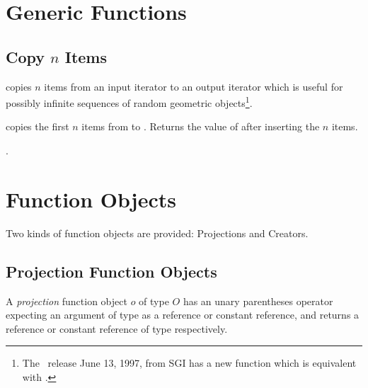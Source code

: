 \section{Generic Functions}
\label{sectionGenericFunctions}

\subsection{Copy $n$ Items}
\label{sectionCopyN}

 copies $n$ items from an input iterator to an
output iterator which is useful for possibly infinite sequences of 
random geometric objects\footnote{%
  The \stl\ release June 13, 1997, from SGI has a new function
   which is equivalent with .}.


{copies the first $n$ items from  to .
    Returns the value of  after inserting the $n$ items.}

\ccSeeAlso

.



\newpage
\section{Function Objects}

Two kinds of function objects are provided: Projections and Creators.

\subsection{Projection Function Objects}
\label{sectionProjectionFunctionObjects}

\ccDefinition 

A {\em projection\/} function object $o$ of type $O$ has an unary parentheses
operator expecting an argument of type  as a
reference or constant reference, and returns a reference or constant
reference of type  respectively.

